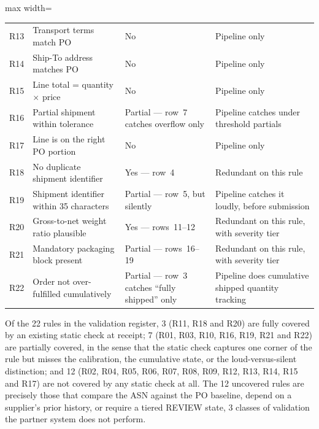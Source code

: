 \begin{table}[htbp]
\begin{adjustbox}{max width=\textwidth}
\begin{tabular}{@{}lp{5cm}p{5cm}p{4.5cm}@{}}
R13 & Transport terms match PO                     & No                                                          & Pipeline only \\
R14 & Ship-To address matches PO                   & No                                                          & Pipeline only \\
R15 & Line total = quantity $\times$ price         & No                                                          & Pipeline only \\
R16 & Partial shipment within tolerance            & Partial --- row~7 catches overflow only                     & Pipeline catches under threshold partials \\
R17 & Line is on the right PO portion              & No                                                          & Pipeline only \\
R18 & No duplicate shipment identifier             & Yes --- row~4                                               & Redundant on this rule \\
R19 & Shipment identifier within 35 characters     & Partial --- row~5, but silently                             & Pipeline catches it loudly, before submission \\
R20 & Gross-to-net weight ratio plausible          & Yes --- rows~11--12                                         & Redundant on this rule, with severity tier \\
R21 & Mandatory packaging block present            & Partial --- rows~16--19                                     & Redundant on this rule, with severity tier \\
R22 & Order not over-fulfilled cumulatively        & Partial --- row~3 catches ``fully shipped'' only            & Pipeline does cumulative shipped quantity tracking \\
\bottomrule
\end{tabular}
\end{adjustbox}
\end{table}

Of the 22 rules in the validation register, 3 (R11, R18 and R20) are fully covered by an existing static check at receipt; 7 (R01, R03, R10, R16, R19, R21 and R22) are partially covered, in the sense that the static check captures one corner of the rule but misses the calibration, the cumulative state, or the loud-versus-silent distinction; and 12 (R02, R04, R05, R06, R07, R08, R09, R12, R13, R14, R15 and R17) are not covered by any static check at all. The 12 uncovered rules are precisely those that compare the ASN against the PO baseline, depend on a supplier's prior history, or require a tiered REVIEW state, 3 classes of validation the partner system does not perform.


